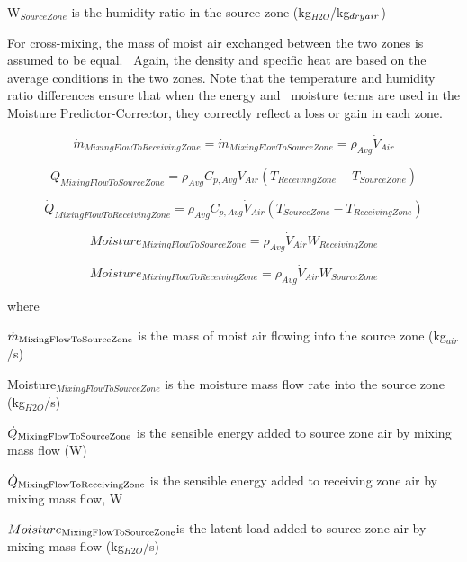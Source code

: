 W\(_{SourceZone}\) is the humidity ratio in the source zone (kg\(_{H2O}\)/kg\(_{dry\\ air}\))

For cross-mixing, the mass of moist air exchanged between the two zones is assumed to be equal.~ Again, the density and specific heat are based on the average conditions in the two zones. Note that the temperature and humidity ratio differences ensure that when the energy and~ moisture terms are used in the Moisture Predictor-Corrector, they correctly reflect a loss or gain in each zone.

\begin{equation}
\dot{m}_{MixingFlowToReceivingZone} = \dot{m}_{MixingFlowToSourceZone} = \rho_{Avg}\dot{V}_{Air}
\end{equation}

\begin{equation}
\dot{Q}_{MixingFlowToSourceZone} = \rho_{Avg} C_{p,Avg} \dot{V}_{Air} \left( T_{ReceivingZone}-T_{SourceZone} \right)
\end{equation}

\begin{equation}
\dot{Q}_{MixingFlowToReceivingZone} = \rho_{Avg} C_{p,Avg} \dot{V}_{Air} \left( T_{SourceZone} - T_{ReceivingZone} \right)
\end{equation}

\begin{equation}
Moisture_{MixingFlowToSourceZone} = \rho_{Avg} \dot{V}_{Air} W_{ReceivingZone}
\end{equation}

\begin{equation}
Moisture_{MixingFlowToReceivingZone} = \rho_{Avg} \dot{V}_{Air} W_{SourceZone}
\end{equation}

where

\({\dot m_{{\rm{MixingFlowToSourceZone}}}}\) is the mass of moist air flowing into the source zone (kg\(_{air}\)/s)

Moisture\(_{MixingFlowToSourceZone}\) is the moisture mass flow rate into the source zone (kg\(_{H2O}\)/s)

\({\dot Q_{{\rm{MixingFlowToSourceZone}}}}\) is the sensible energy added to source zone air by mixing mass flow (W)

\({\dot Q_{{\rm{MixingFlowToReceivingZone}}}}\) is the sensible energy added to receiving zone air by mixing mass flow, W

\(Moistur{e_{{\rm{MixingFlowToSourceZone}}}}\)is the latent load added to source zone air by mixing mass flow (kg\(_{H2O}\)/s)

